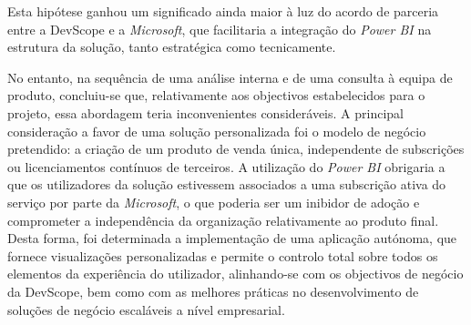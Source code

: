 Esta hipótese ganhou um significado ainda maior à luz do acordo de parceria entre a DevScope e a \textit{Microsoft}, que facilitaria a integração do \textit{Power BI} na estrutura da solução, tanto estratégica como tecnicamente.

No entanto, na sequência de uma análise interna e de uma consulta à equipa de produto, concluiu-se que, relativamente aos objectivos estabelecidos para o projeto, essa abordagem teria inconvenientes consideráveis. A principal consideração a favor de uma solução personalizada foi o modelo de negócio pretendido: a criação de um produto de venda única, independente de subscrições ou licenciamentos contínuos de terceiros. A utilização do \textit{Power BI} obrigaria a que os utilizadores da solução estivessem associados a uma subscrição ativa do serviço por parte da \textit{Microsoft}, o que poderia ser um inibidor de adoção e comprometer a independência da organização relativamente ao produto final. Desta forma, foi determinada a implementação de uma aplicação autónoma, que fornece visualizações personalizadas e permite o controlo total sobre todos os elementos da experiência do utilizador, alinhando-se com os objectivos de negócio da DevScope, bem como com as melhores práticas no desenvolvimento de soluções de negócio escaláveis a nível empresarial.